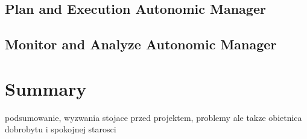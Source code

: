 \subsection{Plan and Execution Autonomic Manager}
\subsection{Monitor and Analyze Autonomic Manager}

\section{Summary}
podsumowanie, wyzwania stojace przed projektem, problemy ale takze obietnica dobrobytu i spokojnej starosci
